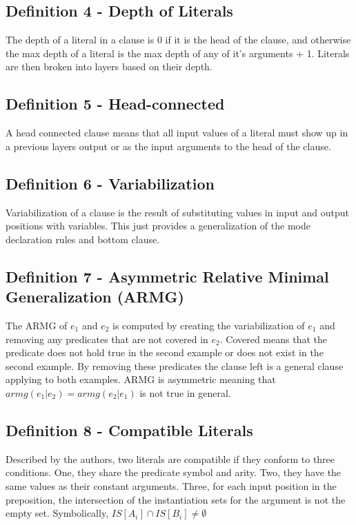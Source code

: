 \documentclass[jair,twoside,11pt,theapa]{article}
\begin{document}
\subsection{Definition 4 - Depth of Literals}
The depth of a literal in a clause is 0 if it is the head of the clause, and otherwise the max depth of a literal is the max depth of any of it's arguments + 1. Literals are then broken into layers based on their depth. 

\subsection{Definition 5 - Head-connected}
A head connected clause means that all input values of a literal must show up in a previous layers output or as the input arguments to the head of the clause. 

\subsection{Definition 6 - Variabilization}
Variabilization of a clause is the result of substituting values in input and output positions with variables. This just provides a generalization of the mode declaration rules and bottom clause. 

\subsection{Definition 7 - Asymmetric Relative Minimal Generalization (ARMG)}
The ARMG of $e_1$ and $e_2$ is computed by creating the variabilization of $e_1$ and removing any predicates that are not covered in $e_2$. Covered means that the predicate does not hold true in the second example or does not exist in the second example. By removing these predicates the clause left is a general clause applying to both examples. ARMG is asymmetric meaning that $armg(e_1|e_2) = armg(e_2|e_1)$ is not true in general. 

\subsection{Definition 8 - Compatible Literals}
Described by the authors, two literals are compatible if they conform to three conditions. One, they share the predicate symbol and arity. Two, they have the same values as their constant arguments. Three, for each input position in the preposition, the intersection of the instantiation sets for the argument is not the empty set. Symbolically, $IS[A_i] \cap IS[B_i] \not = \emptyset$ 
\end{document}
